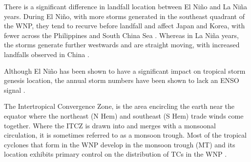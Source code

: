 There is a significant difference in landfall location between El Ni\~{n}o and La Ni\~{n}a years. During El Ni\~{n}o, with more storms generated in the southeast quadrant of the WNP, they tend to recurve before landfall and affect Japan and Korea, with fewer across the Philippines and South China Sea \citep{liu2008interdecadal}. Whereas in La Ni\~{n}a years, the storms generate further westwards and are straight moving, with increased landfalls observed in China \citep{camargo2007cluster}.



Although El Ni\~{n}o has been shown to have a significant impact on tropical storm genesis location, the annual storm numbers have been shown to lack an ENSO signal \citep{lander1994exploratory}.






The Intertropical Convergence Zone, is the area encircling the earth near the equator where the northeast (N Hem) and southeast (S Hem) trade winds come together. Where the ITCZ is drawn into and merges with a monsoonal circulation, it is sometimes referred to as a monsoon trough. Most of the tropical cyclones that form in the WNP develop in the monsoon trough (MT) \citep{lander1994exploratory} and its location exhibits primary control on the distribution of TCs in the WNP \citep{wuinfluence}. 

